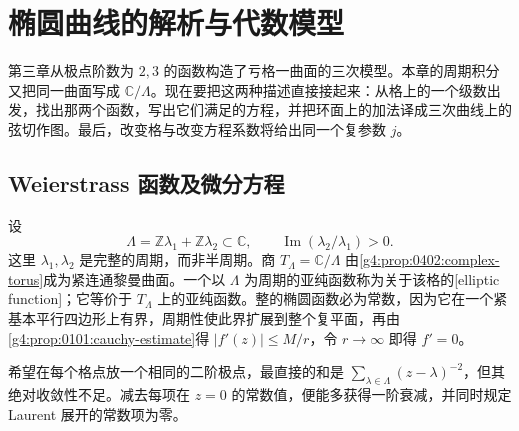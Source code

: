 
% 
% 
% 

\section{椭圆曲线的解析与代数模型}
\label{g4:sec:0405}

第三章从极点阶数为 \(2,3\) 的函数构造了亏格一曲面的三次模型。本章的周期积分又把同一曲面写成 \(\mathbb C/\Lambda\)。现在要把这两种描述直接接起来：从格上的一个级数出发，找出那两个函数，写出它们满足的方程，并把环面上的加法译成三次曲线上的弦切作图。最后，改变格与改变方程系数将给出同一个复参数 \(j\)。

\subsection{Weierstrass 函数及微分方程}
\label{g4:subsec:0405:01}

设
\[
	\Lambda=\mathbb Z\lambda_1+\mathbb Z\lambda_2\subset\mathbb C,
	\qquad \operatorname{Im}(\lambda_2/\lambda_1)>0.
\]
这里 \(\lambda_1,\lambda_2\) 是完整的周期，而非半周期。商 \(T_\Lambda=\mathbb C/\Lambda\) 由\cref{g4:prop:0402:complex-torus}成为紧连通黎曼曲面。一个以 \(\Lambda\) 为周期的亚纯函数称为关于该格的[elliptic function]；它等价于 \(T_\Lambda\) 上的亚纯函数。整的椭圆函数必为常数，因为它在一个紧基本平行四边形上有界，周期性使此界扩展到整个复平面，再由\cref{g4:prop:0101:cauchy-estimate}得 \(|f'(z)|\le M/r\)，令 \(r\to\infty\) 即得 \(f'=0\)。

\ProseParagraphBreak

希望在每个格点放一个相同的二阶极点，最直接的和是 \(\sum_{\lambda\in\Lambda}(z-\lambda)^{-2}\)，但其绝对收敛性不足。减去每项在 \(z=0\) 的常数值，便能多获得一阶衰减，并同时规定 Laurent 展开的常数项为零。

